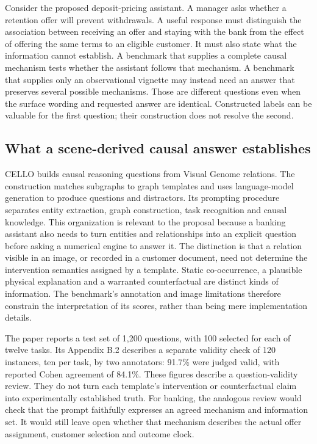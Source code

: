 Consider the proposed deposit-pricing assistant. A manager asks whether a
retention offer will prevent withdrawals. A useful response must distinguish
the association between receiving an offer and staying with the bank from the
effect of offering the same terms to an eligible customer. It must also state
what the information cannot establish. A benchmark that supplies a complete
causal mechanism tests whether the assistant follows that mechanism. A
benchmark that supplies only an observational vignette may instead need an
answer that preserves several possible mechanisms. Those are different
questions even when the surface wording and requested answer are identical.
Constructed labels can be valuable for the first question; their construction
does not resolve the second.

\subsection{What a scene-derived causal answer establishes}

CELLO builds causal reasoning questions from Visual Genome relations. The
construction matches subgraphs to graph templates and uses language-model
generation to produce questions and distractors. Its prompting procedure
separates entity extraction, graph construction, task recognition and causal
knowledge. This organization is relevant to the proposal because a banking
assistant also needs to turn entities and relationships into an explicit
question before asking a numerical engine to answer it. The distinction is
that a relation visible in an image, or recorded in a customer document, need
not determine the intervention semantics assigned by a template. Static
co-occurrence, a plausible physical explanation and a warranted counterfactual
are distinct kinds of information. The benchmark's annotation and image
limitations therefore constrain the interpretation of its scores, rather than
being mere implementation details.~\citep{exec17_benchmark_cello}

The paper reports a test set of 1,200 questions, with 100 selected for each of
twelve tasks. Its Appendix B.2 describes a separate validity check of 120
instances, ten per task, by two annotators: 91.7\% were judged valid, with
reported Cohen agreement of 84.1\%. These figures describe a question-validity
review. They do not turn each template's intervention or counterfactual claim
into experimentally established truth. For banking, the analogous review
would check that the prompt faithfully expresses an agreed mechanism and
information set. It would still leave open whether that mechanism describes
the actual offer assignment, customer selection and outcome clock.
\citep{exec17_benchmark_cello}

